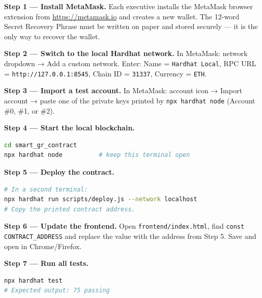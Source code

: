\documentclass[12pt,a4paper]{article}
\begin{document}
\textbf{Step 1 — Install MetaMask.}
Each executive installs the MetaMask browser extension from \url{https://metamask.io} and creates a new wallet. The 12-word Secret Recovery Phrase must be written on paper and stored securely — it is the only way to recover the wallet.

\textbf{Step 2 — Switch to the local Hardhat network.}
In MetaMask: network dropdown → Add a custom network. Enter: Name = \texttt{Hardhat Local}, RPC URL = \texttt{http://127.0.0.1:8545}, Chain ID = \texttt{31337}, Currency = \texttt{ETH}.

\textbf{Step 3 — Import a test account.}
In MetaMask: account icon → Import account → paste one of the private keys printed by \texttt{npx hardhat node} (Account \#0, \#1, or \#2).

\textbf{Step 4 — Start the local blockchain.}
\begin{lstlisting}[language=bash]
cd smart_gr_contract
npx hardhat node          # keep this terminal open
\end{lstlisting}

\textbf{Step 5 — Deploy the contract.}
\begin{lstlisting}[language=bash]
# In a second terminal:
npx hardhat run scripts/deploy.js --network localhost
# Copy the printed contract address.
\end{lstlisting}

\textbf{Step 6 — Update the frontend.}
Open \texttt{frontend/index.html}, find \texttt{const CONTRACT\_ADDRESS} and replace the value with the address from Step 5. Save and open in Chrome/Firefox.

\textbf{Step 7 — Run all tests.}
\begin{lstlisting}[language=bash]
npx hardhat test
# Expected output: 75 passing
\end{lstlisting}
\end{document}
